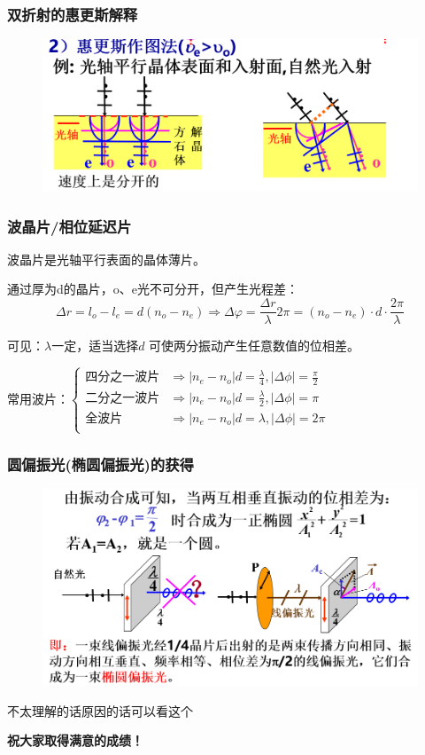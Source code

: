 \documentclass[UTF8]{ctexbeamer}
\begin{document}
\begin{frame}
	\frametitle{双折射的惠更斯解释}
	\begin{figure}[!ht]
		\centering
		\includegraphics[width=1\textwidth]{35}
	\end{figure}		
\end{frame}
\begin{frame}
\frametitle{波晶片/相位延迟片}
波晶片是光轴平行表面的晶体薄片。

通过厚为d的晶片，o、e光不可分开，但产生光程差：$$\Delta r=l_{{o}}-l_{{e}}=d(n_o-n_{{e}})\Rightarrow \Delta\varphi=\frac{\Delta r}\lambda2\pi=(n_o-n_e)\cdot d\cdot\frac{2\pi}\lambda $$
	
可见：$\lambda$一定，适当选择$d$ 可使两分振动产生任意数值的位相差。
		
常用波片：$\begin{cases}
	\text{四分之一波片}&\Rightarrow|n_e-n_o|d=\frac{\lambda}{4},|\Delta \phi| = \frac{\pi}{2}\\
	\text{二分之一波片}&\Rightarrow|n_e-n_o|d=\frac{\lambda}{2}, |\Delta \phi| = {\pi}\\
	\text{全波片}&\Rightarrow|n_e-n_o|d={\lambda}, |\Delta \phi| = {2\pi}\\
\end{cases}$
	
\end{frame}
\begin{frame}
	\frametitle{圆偏振光(椭圆偏振光)的获得}
	\begin{figure}[!ht]
		\centering
		\includegraphics[width=1\textwidth]{36}
	\end{figure}
	不太理解的话原因的话可以看这个\href{https://www.bilibili.com/video/BV1Lt411t7Lh?vd_source=827e9d926cec44ef6817b376d985aae5}{\color{blue}{视频}}
\end{frame}
\begin{frame}

	\centering\Huge{\textbf{祝大家取得满意的成绩！}}		
\end{frame}
\end{document}
